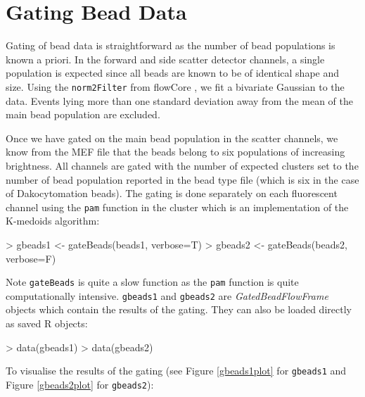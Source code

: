 \documentclass[11pt]{article}
\newcommand{\Rfunction}[1]{{\texttt{#1}}}
\newcommand{\Rcode}[1]{{\texttt{#1}}}
\newcommand{\Robject}[1]{{\texttt{#1}}}
\newcommand{\Rpackage}[1]{{\textsf{#1}}}
\newcommand{\Rclass}[1]{{\textit{#1}}}
\begin{document}
\section{Gating Bead Data}

Gating of bead data is straightforward as the number of bead populations is known a priori.
In the forward and side scatter detector channels, a single population is expected since all beads are known to be of identical shape and size.
Using the \Rfunction{norm2Filter} from \Rpackage{flowCore} \citep{rpackage:flowcore},
we fit a bivariate Gaussian to the data.
Events lying more than one standard deviation away from the mean of the main bead population are excluded.%

Once we have gated on the main bead population in the scatter channels, we know from the MEF file that the beads belong to six populations of increasing brightness.
All channels are gated with the number of expected clusters set to the number of bead population reported in the bead type file
(which is six in the case of Dakocytomation beads).
The gating is done separately on each fluorescent channel using the \Rfunction{pam} function in the \Rpackage{cluster} \citep{rpackage:cluster} which is an implementation of the K-medoids algorithm:

\begin{Schunk}
\begin{Sinput}
> gbeads1 <- gateBeads(beads1, verbose=T)
> gbeads2 <- gateBeads(beads2, verbose=F)
\end{Sinput}
\end{Schunk}

\noindent
Note \Rfunction{gateBeads} is quite a slow function as the \Rfunction{pam} function is quite computationally intensive.
\Rcode{gbeads1} and \Rcode{gbeads2} are \Rclass{GatedBeadFlowFrame} objects which contain the results of the gating.
They can also be loaded directly as saved R objects:

\begin{Schunk}
\begin{Sinput}
> data(gbeads1)
> data(gbeads2)
\end{Sinput}
\end{Schunk}

\noindent
To visualise the results of the gating (see Figure \ref{gbeads1plot} for \Robject{gbeads1} and Figure \ref{gbeads2plot} for \Robject{gbeads2}):
\end{document}
